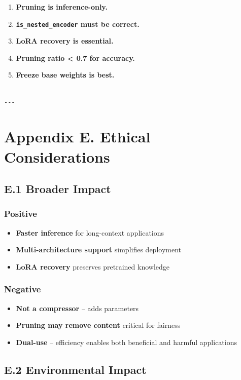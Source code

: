 \begin{enumerate}
\item \textbf{Pruning is inference-only.}
\item \textbf{\texttt{is\_nested\_encoder} must be correct.}
\item \textbf{LoRA recovery is essential.}
\item \textbf{Pruning ratio < 0.7 for accuracy.}
\item \textbf{Freeze base weights is best.}
\end{enumerate}
\begin{lstlisting}

---
\end{lstlisting}


\section{Appendix E. Ethical Considerations}

\subsection{E.1 Broader Impact}

\subsubsection{Positive}
\begin{itemize}
\item \textbf{Faster inference} for long-context applications
\item \textbf{Multi-architecture support} simplifies deployment
\item \textbf{LoRA recovery} preserves pretrained knowledge

\end{itemize}
\subsubsection{Negative}
\begin{itemize}
\item \textbf{Not a compressor} -- adds parameters
\item \textbf{Pruning may remove content} critical for fairness
\item \textbf{Dual-use} -- efficiency enables both beneficial and harmful applications

\end{itemize}
\subsection{E.2 Environmental Impact}

